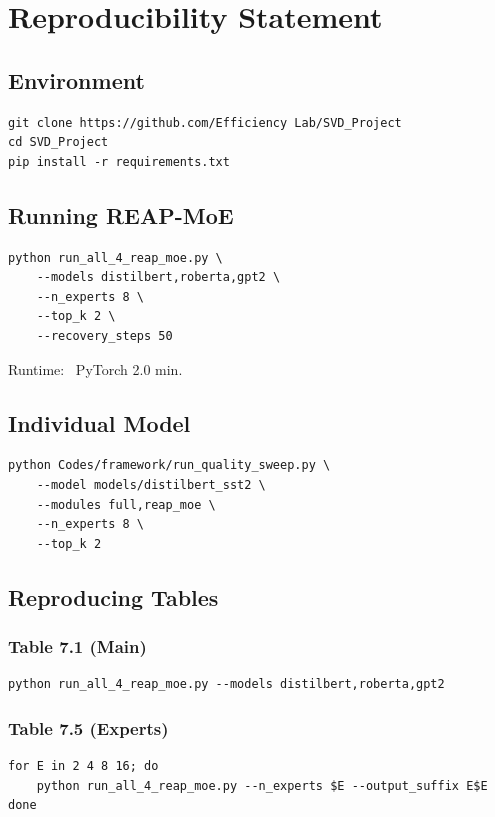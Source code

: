 \section{Reproducibility Statement}

\subsection{Environment}

\begin{lstlisting}
git clone https://github.com/Efficiency Lab/SVD_Project
cd SVD_Project
pip install -r requirements.txt
\end{lstlisting}

\subsection{Running REAP-MoE}

\begin{lstlisting}
python run_all_4_reap_moe.py \
    --models distilbert,roberta,gpt2 \
    --n_experts 8 \
    --top_k 2 \
    --recovery_steps 50
\end{lstlisting}

Runtime: ~PyTorch 2.0 min.

\subsection{Individual Model}

\begin{lstlisting}
python Codes/framework/run_quality_sweep.py \
    --model models/distilbert_sst2 \
    --modules full,reap_moe \
    --n_experts 8 \
    --top_k 2
\end{lstlisting}

\subsection{Reproducing Tables}

\subsubsection{Table 7.1 (Main)}
\begin{lstlisting}
python run_all_4_reap_moe.py --models distilbert,roberta,gpt2
\end{lstlisting}

\subsubsection{Table 7.5 (Experts)}
\begin{lstlisting}
for E in 2 4 8 16; do
    python run_all_4_reap_moe.py --n_experts $E --output_suffix E$E
done
\end{lstlisting}

